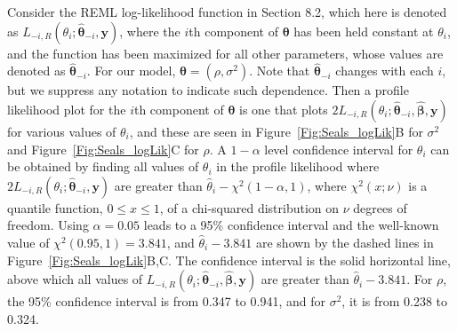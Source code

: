 \documentclass[12pt, titlepage]{article}
\begin{document}
Consider the REML log-likelihood function in Section 8.2, which here is denoted as $L_{-i,R}(\theta_{i};\hat{\boldsymbol{\theta}}_{-i},\mathbf{y})$, where the $i$th component of $\boldsymbol{\theta}$ has been held constant at $\theta_{i}$, and the function has been maximized for all other parameters, whose values are denoted as $\hat{\boldsymbol{\theta}}_{-i}$.  For our model, $\boldsymbol{\theta} = (\rho, \sigma^{2})$.  Note that $\hat{\boldsymbol{\theta}}_{-i}$ changes with each $i$, but we suppress any notation to indicate such dependence. Then a profile likelihood plot for the $i$th component of $\boldsymbol{\theta}$ is one that plots $2L_{-i,R}(\theta_{i};\hat{\boldsymbol{\theta}}_{-i},\hat{\boldsymbol{\beta}},\mathbf{y})$ for various values of $\theta_{i}$, and these are seen in Figure~\ref{Fig:Seals_logLik}B for $\sigma^{2}$ and Figure~\ref{Fig:Seals_logLik}C for $\rho$.  A $1-\alpha$ level confidence interval for $\theta_{i}$ can be obtained by finding all values of $\theta_{i}$ in the profile likelihood where $2L_{-i,R}(\theta_{i};\hat{\boldsymbol{\theta}}_{-i},\mathbf{y})$ are greater than $\hat{\theta}_{i} - \chi^{2}(1-\alpha,1)$, where $\chi^{2}(x;\nu)$ is a quantile function, $0 \le x \le1$, of a chi-squared distribution on $\nu$ degrees of freedom. Using $\alpha = 0.05$ leads to a 95\% confidence interval and the well-known value of $\chi^{2}(0.95,1) = 3.841$, and $\hat{\theta}_{i} - 3.841$ are shown by the dashed lines in Figure~\ref{Fig:Seals_logLik}B,C. The confidence interval is the solid horizontal line, above which all values of $L_{-i,R}(\theta_{i};\hat{\boldsymbol{\theta}}_{-i},\hat{\boldsymbol{\beta}},\mathbf{y})$ are greater than $\hat{\theta}_{i} - 3.841$. For $\rho$, the 95\% confidence interval is from 0.347 to 0.941, and for $\sigma^{2}$, it is from 0.238 to 0.324. 
\end{document}
